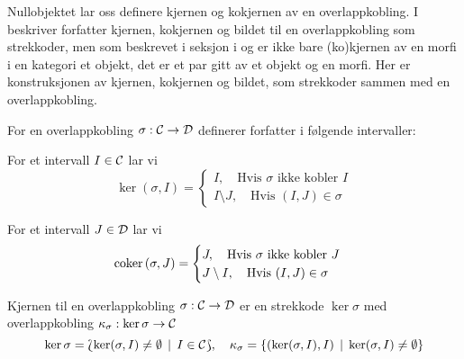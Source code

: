 Nullobjektet lar oss definere kjernen og kokjernen av en
overlappkobling. I \citep[seksjon 2.5]{Bauer2020} beskriver
forfatter kjernen, kokjernen og bildet til en
overlappkobling som strekkoder, men som beskrevet i seksjon
i  og
 er ikke bare (ko)kjernen
av en morfi i en kategori et objekt, det er et par gitt av
et objekt og en morfi. Her er konstruksjonen av kjernen,
kokjernen og bildet, som strekkoder
sammen med en overlappkobling.

For en overlappkobling $\sigma:\mathcal{C}\to\mathcal{D}$ definerer
forfatter i \citep[seksjon 2.5]{Bauer2020} følgende
intervaller:

For et intervall $I\in\mathcal{C}$ lar vi
\[\ker(\sigma,I) =
\begin{cases}
  I,\quad\text{Hvis $\sigma$ ikke kobler $I$}\\
  I\setminus J,\quad\text{Hvis $(I,J)\in\sigma$}
\end{cases}
\]

For et intervall $J\in\mathcal{D}$ lar vi
\[\textnormal{coker}\,(\sigma,J) = 
\begin{cases}
  J,\quad\text{Hvis $\sigma$ ikke kobler $J$}\\
  J\setminus I,\quad\text{Hvis $(I,J)\in\sigma$}
\end{cases}
\]

\begin{teorem}\label{trm:ker}
  Kjernen til en overlappkobling $\sigma:\mathcal{C}\to\mathcal{D}$
  er en strekkode $\ker\sigma$ med overlappkobling
  $\kappa_\sigma:\ker\sigma\to\mathcal{C}$
  \[\ker\sigma = \Lbag \ker(\sigma,
    I)\neq\emptyset\,\mid\, I\in\mathcal{C}\Rbag,\quad\kappa_\sigma
  = \left\{(\ker(\sigma,I),I)\,\mid\,\ker(\sigma,I)\neq\emptyset\right\}\]
\end{teorem}

